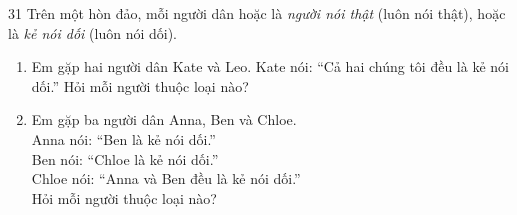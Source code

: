 \clearpage
{}

\begin{probbox}{31}{\relax}
Trên một hòn đảo, mỗi người dân hoặc là \emph{người nói thật} (luôn nói thật), hoặc là \emph{kẻ nói dối} (luôn nói dối).
\begin{enumerate}[label=\alph*),leftmargin=1.6em,itemsep=1pt,topsep=2pt]
  \item Em gặp hai người dân Kate và Leo. Kate nói: ``Cả hai chúng tôi đều là kẻ nói dối.'' Hỏi mỗi người thuộc loại nào?
  \item Em gặp ba người dân Anna, Ben và Chloe.\\
  Anna nói: ``Ben là kẻ nói dối.''\\
  Ben nói: ``Chloe là kẻ nói dối.''\\
  Chloe nói: ``Anna và Ben đều là kẻ nói dối.''\\
  Hỏi mỗi người thuộc loại nào?
\end{enumerate}
\end{probbox}
